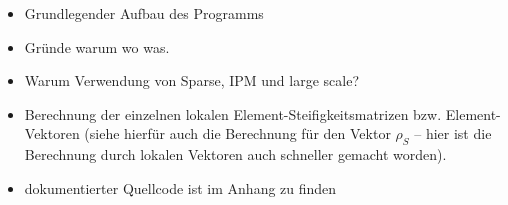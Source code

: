 
\begin{itemize}
\item Grundlegender Aufbau des Programms
\item Gründe warum wo was.
\item Warum Verwendung von Sparse, IPM und large scale?
\item Berechnung der einzelnen lokalen Element-Steifigkeitsmatrizen bzw. Element-Vektoren (siehe hierfür auch die Berechnung für den Vektor $\rho_S$ – hier ist die Berechnung durch lokalen Vektoren auch schneller gemacht worden).
\item dokumentierter Quellcode ist im Anhang zu finden
\end{itemize}

\newpage

